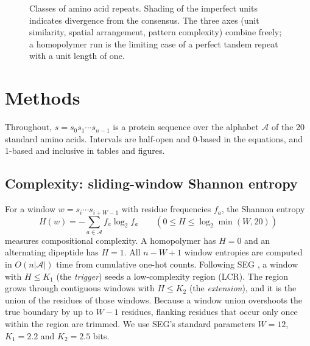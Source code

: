 \documentclass[11pt,a4paper]{article}
\begin{document}
\begin{figure}[tbp]
\centering

\caption{Classes of amino acid repeats. Shading of the imperfect units indicates divergence from the consensus.
The three axes (unit similarity, spatial arrangement, pattern complexity) combine freely; a homopolymer run is
the limiting case of a perfect tandem repeat with a unit length of one.}
\label{fig:classes}
\end{figure}

\section{Methods}\label{sec:methods}

Throughout, $s = s_0 s_1 \cdots s_{n-1}$ is a protein sequence over the alphabet $\mathcal{A}$ of the
20 standard amino acids. Intervals are half-open and 0-based in the equations, and 1-based and inclusive
in tables and figures.

\subsection{Complexity: sliding-window Shannon entropy}\label{sec:entropy}
For a window $w = s_i \cdots s_{i+W-1}$ with residue frequencies $f_a$, the Shannon entropy \cite{shannon1948}
\begin{equation}
  H(w) = -\sum_{a\in\mathcal{A}} f_a \log_2 f_a \qquad (0 \le H \le \log_2 \min(W,20))
\end{equation}
measures compositional complexity. A homopolymer has $H=0$ and an alternating dipeptide has $H=1$.
All $n-W+1$ window entropies are computed in $O(n|\mathcal{A}|)$ time from cumulative one-hot counts.
Following SEG \cite{wootton1993seg}, a window with $H \le K_1$ (the \emph{trigger}) seeds a low-complexity
region (LCR). The region grows through contiguous windows with $H \le K_2$ (the \emph{extension}), and it is the
union of the residues of those windows. Because a window union overshoots the true boundary by up to $W-1$
residues, flanking residues that occur only once within the region are trimmed. We use SEG's standard
parameters $W=12$, $K_1=2.2$ and $K_2=2.5$ bits.
\end{document}
